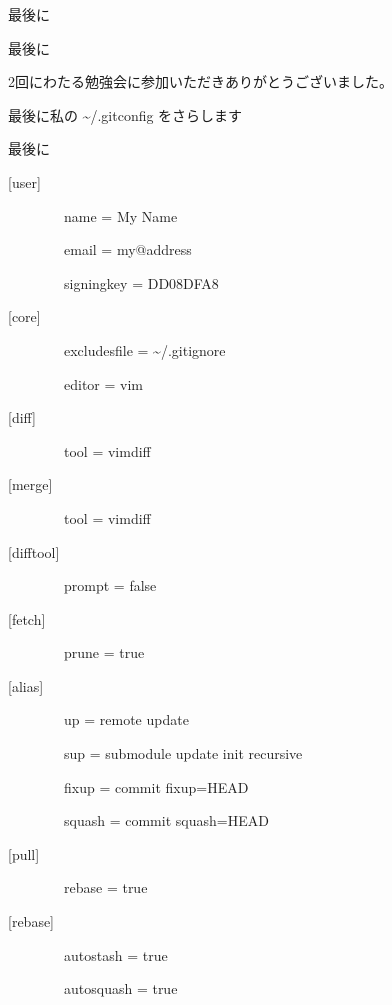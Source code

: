 % 
% 
% 
% 

\begin{frame}{}{}
  最後に
\end{frame}


\begin{frame}[t]{最後に}{}

  2回にわたる勉強会に参加いただきありがとうございました。

  最後に私の \~{}/.gitconfig をさらします

\end{frame}


\begin{frame}[t]{最後に}{}

{\tiny
[user]

~~~~~~~~name = My Name

~~~~~~~~email = my@address

~~~~~~~~signingkey = DD08DFA8

[core]

~~~~~~~~excludesfile = \~{}/.gitignore

~~~~~~~~editor = vim

[diff]

~~~~~~~~tool = vimdiff

[merge]

~~~~~~~~tool = vimdiff

[difftool]

~~~~~~~~prompt = false

[fetch]

~~~~~~~~prune = true

[alias]

~~~~~~~~up = remote update

~~~~~~~~sup = submodule update {\dhyphen}init {\dhyphen}recursive

~~~~~~~~fixup = commit {\dhyphen}fixup=HEAD

~~~~~~~~squash = commit {\dhyphen}squash=HEAD

[pull]

~~~~~~~~rebase = true

[rebase]

~~~~~~~~autostash = true

~~~~~~~~autosquash = true

}
\end{frame}
